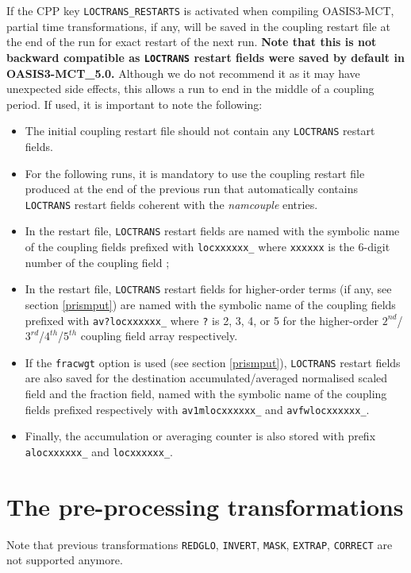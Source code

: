\begin{itemize}
If the CPP key {\tt LOCTRANS\_RESTARTS} is activated when compiling OASIS3-MCT, partial time transformations, if any, will be saved in the coupling restart file at the end of the run for exact restart of the next run. {\bf Note that this is not backward compatible as {\tt LOCTRANS} restart fields were saved by default in OASIS3-MCT\_5.0.} Although we do not recommend it as it may have unexpected side effects, this allows a run to end in the middle of a coupling period. If used, it is important to note the following:
\begin{itemize}
\item The initial coupling restart file should not contain any {\tt LOCTRANS}  restart fields.
\item For the following runs, it is mandatory to use the coupling restart file produced at the end of the previous run that automatically contains {\tt LOCTRANS} restart fields coherent with the {\it namcouple} entries.
\item In the restart file, {\tt LOCTRANS} restart fields are named with the symbolic name of the coupling fields prefixed with {\tt locxxxxxx\_} where {\tt xxxxxx} is the 6-digit number of the coupling field ;
\item In the restart file, {\tt LOCTRANS} restart fields for higher-order terms (if any, see section \ref{prismput}) are named with the symbolic name of the coupling fields prefixed with {\tt av?locxxxxxx\_} where {\tt ?} is 2, 3, 4, or 5 for the higher-order $2^{nd}$/$3^{rd}$/$4^{th}$/$5^{th}$ coupling field array respectively.
\item If the {\tt fracwgt} option is used (see section \ref{prismput}), {\tt LOCTRANS} restart fields are also saved for the destination accumulated/averaged normalised scaled field and the fraction field, named with the symbolic name of the coupling fields prefixed respectively with {\tt av1mlocxxxxxx\_} and {\tt avfwlocxxxxxx\_}.
\item Finally, the accumulation or averaging counter is also stored with prefix {\tt alocxxxxxx\_} and {\tt locxxxxxx\_}.
\end{itemize} 
\end{itemize}

\section{The pre-processing transformations}
\label{subsec_preproc}

Note that previous transformations {\tt REDGLO}, {\tt INVERT}, {\tt MASK}, {\tt EXTRAP}, {\tt CORRECT} are not supported anymore.

